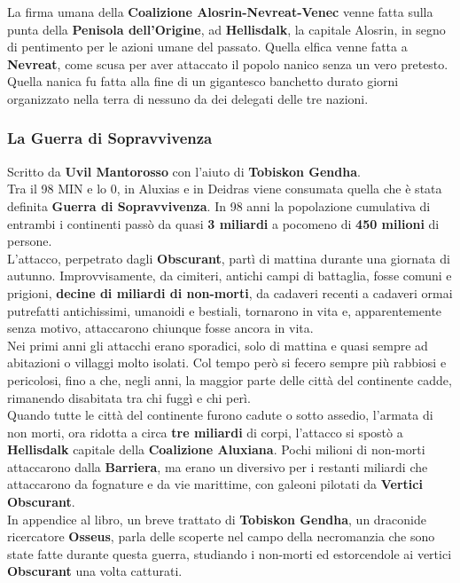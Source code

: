 \documentclass[10pt,twoside,onecolumn,openany]{book}
\begin{document}
La firma umana della \textbf{Coalizione Alosrin-Nevreat-Venec} venne fatta sulla punta della \textbf{Penisola dell'Origine}, ad \textbf{Hellisdalk}, la capitale Alosrin, in segno di pentimento per le azioni umane del passato. Quella elfica venne fatta a \textbf{Nevreat}, come scusa per aver attaccato il popolo nanico senza un vero pretesto. Quella nanica fu fatta alla fine di un gigantesco banchetto durato giorni organizzato nella terra di nessuno da dei delegati delle tre nazioni.\\
\newpage
\subsubsection{La Guerra di Sopravvivenza}
Scritto da \textbf{Uvil Mantorosso} con l'aiuto di \textbf{Tobiskon Gendha}.\\
Tra il 98 MIN e lo 0, in Aluxias e in Deidras viene consumata quella che è stata definita \textbf{Guerra di Sopravvivenza}. In 98 anni la popolazione cumulativa di entrambi i continenti passò da quasi \textbf{3 miliardi} a pocomeno di \textbf{450 milioni} di persone.\\
L'attacco, perpetrato dagli \textbf{Obscurant}, partì di mattina durante una giornata di autunno. Improvvisamente, da cimiteri, antichi campi di battaglia, fosse comuni e prigioni,  \textbf{decine di miliardi di non-morti}, da cadaveri recenti a cadaveri ormai putrefatti antichissimi, umanoidi e bestiali, tornarono in vita e, apparentemente senza motivo, attaccarono chiunque fosse ancora in vita.\\
Nei primi anni gli attacchi erano sporadici, solo di mattina e quasi sempre ad abitazioni o villaggi molto isolati. Col tempo però si fecero sempre più rabbiosi e pericolosi, fino a che, negli anni, la maggior parte delle città del continente cadde, rimanendo disabitata tra chi fuggì e chi perì.\\
Quando tutte le città del continente furono cadute o sotto assedio, l'armata di non morti, ora ridotta a circa \textbf{tre miliardi} di corpi, l'attacco si spostò a \textbf{Hellisdalk} capitale della \textbf{Coalizione Aluxiana}. Pochi milioni di non-morti attaccarono dalla \textbf{Barriera}, ma erano un diversivo per i restanti miliardi che attaccarono da fognature e da vie marittime, con galeoni pilotati da \textbf{Vertici Obscurant}.\\
In appendice al libro, un breve trattato di \textbf{Tobiskon Gendha}, un draconide ricercatore \textbf{Osseus}, parla delle scoperte nel campo della necromanzia che sono state fatte durante questa guerra, studiando i non-morti ed estorcendole ai vertici \textbf{Obscurant} una volta catturati.
\end{document}
